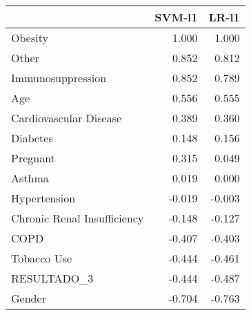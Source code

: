 \begin{tabular}{lrr}
\toprule
{} &  SVM-l1 &  LR-l1 \\
\midrule
Obesity                     &   1.000 &  1.000 \\
Other                       &   0.852 &  0.812 \\
Immunosuppression           &   0.852 &  0.789 \\
Age                         &   0.556 &  0.555 \\
Cardiovascular Disease      &   0.389 &  0.360 \\
Diabetes                    &   0.148 &  0.156 \\
Pregnant                    &   0.315 &  0.049 \\
Asthma                      &   0.019 &  0.000 \\
Hypertension                &  -0.019 & -0.003 \\
Chronic Renal Insufficiency &  -0.148 & -0.127 \\
COPD                        &  -0.407 & -0.403 \\
Tobacco Use                 &  -0.444 & -0.461 \\
RESULTADO\_3                 &  -0.444 & -0.487 \\
Gender                      &  -0.704 & -0.763 \\
\bottomrule
\end{tabular}

